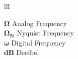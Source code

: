 \documentclass[
11pt, %
english, %
singlespacing, %
headsepline, %
]{MastersDoctoralThesis} %
\begin{document}

%
%
%


\begin{symbols}{lll} %

$\boldsymbol{\Omega}$ \hfill Analog Frequency\\
$\boldsymbol{\Omega_N}$ \hfill Nyquist Frequency\\
$\boldsymbol{\omega}$ \hfill Digital Frequency \\
$\boldsymbol{\si{dB}}$ \hfill Decibel



\end{symbols}




\mainmatter %
\end{document}
